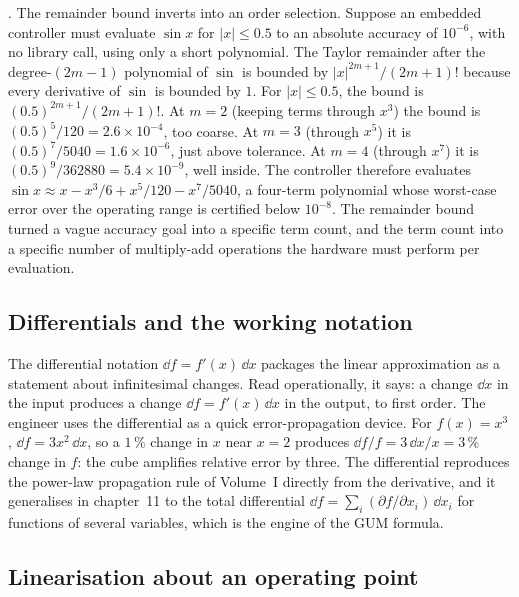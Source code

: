 . The remainder
bound inverts into an order selection. Suppose an embedded
controller must evaluate $\sin x$ for $|x| \leq 0.5$ to an
absolute accuracy of $10^{-6}$, with no library call, using only a
short polynomial. The Taylor remainder after the degree-$(2m-1)$
polynomial of $\sin$ is bounded by $|x|^{2m+1}/(2m+1)!$ because
every derivative of $\sin$ is bounded by $1$. For $|x| \leq 0.5$,
the bound is $(0.5)^{2m+1}/(2m+1)!$. At $m = 2$ (keeping terms
through $x^{3}$) the bound is $(0.5)^{5}/120 = 2.6 \times 10^{-4}$,
too coarse. At $m = 3$ (through $x^{5}$) it is $(0.5)^{7}/5040 =
1.6 \times 10^{-6}$, just above tolerance. At $m = 4$ (through
$x^{7}$) it is $(0.5)^{9}/362880 = 5.4 \times 10^{-9}$, well
inside. The controller therefore evaluates $\sin x \approx x -
x^{3}/6 + x^{5}/120 - x^{7}/5040$, a four-term polynomial whose
worst-case error over the operating range is certified below
$10^{-8}$. The remainder bound turned a vague accuracy goal into a
specific term count, and the term count into a specific number of
multiply-add operations the hardware must perform per evaluation.

\subsection{Differentials and the working notation}

The differential notation $\dd f = f'(x) \, \dd x$ packages the
linear approximation as a statement about infinitesimal changes.
Read operationally, it says: a change $\dd x$ in the input produces
a change $\dd f = f'(x) \, \dd x$ in the output, to first order. The
engineer uses the differential as a quick error-propagation device.
For $f(x) = x^{3}$, $\dd f = 3 x^{2} \, \dd x$, so a $1\,\%$ change
in $x$ near $x = 2$ produces $\dd f / f = 3 \, \dd x / x = 3\,\%$
change in $f$: the cube amplifies relative error by three. The
differential reproduces the power-law propagation rule of Volume~I
directly from the derivative, and it generalises in chapter~11 to
the total differential $\dd f = \sum_{i} (\partial f / \partial
x_{i}) \, \dd x_{i}$ for functions of several variables, which is
the engine of the GUM formula.

\subsection{Linearisation about an operating point}

